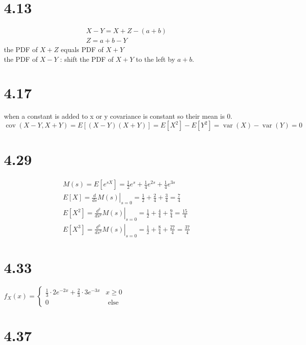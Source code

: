 \documentclass{article}
\begin{document}
	\section*{4.13}
		$$
		\begin{gathered}
		X-Y=X+Z-(a+b) \\
		Z=a+b-Y
		\end{gathered}
		$$
		the PDF of $X+Z$ equals PDF of $X+Y$\\
		the PDF of $X-Y$ : shift the PDF of $X+Y$ to the left by $a+b$.
		

			
		
	\section*{4.17}
			
		when a constant is added to x or y covariance is constant so their mean is 0.
		$$
		\operatorname{cov}(X-Y, X+Y)=E[(X-Y)(X+Y)]=E\left[X^{2}\right]-E\left[Y^{2}\right]=\operatorname{var}(X)-\operatorname{var}(Y)=0
		$$

	\section*{4.29}
	
		$$
		\begin{gathered}
		M(s)=E\left[e^{s X}\right]=\frac{1}{2} e^{s}+\frac{1}{4} e^{2 s}+\frac{1}{4} e^{3 s} \\
		E[X]=\left.\frac{d}{d s} M(s)\right|_{s=0}=\frac{1}{2}+\frac{2}{4}+\frac{3}{4}=\frac{7}{4} \\
		E\left[X^{2}\right]=\left.\frac{d^{2}}{d s^{2}} M(s)\right|_{s=0}=\frac{1}{2}+\frac{4}{4}+\frac{9}{4}=\frac{15}{4} \\
		E\left[X^{3}\right]=\left.\frac{d^{3}}{d s^{3}} M(s)\right|_{s=0}=\frac{1}{2}+\frac{8}{4}+\frac{27}{4}=\frac{37}{4}
		\end{gathered}
		$$


	\section*{4.33}
	

		$f_{X}(x)= \begin{cases}\frac{1}{3} \cdot 2 e^{-2 x}+\frac{2}{3} \cdot 3 e^{-3 x} &  x \geq 0 \\ 0 & \text { else }\end{cases}$


	\section*{4.37}
	
\end{document}
